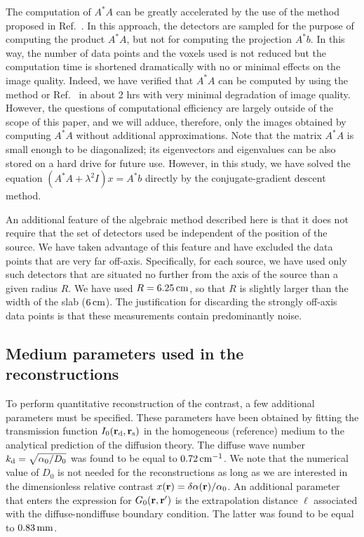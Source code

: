 The computation of $A^*A$ can be greatly accelerated by the use of the method proposed in Ref.~\cite{markel_05_6}. In this approach, the detectors are sampled for the purpose of computing the product $A^*A$, but not for computing the projection $A^*b$. In this way, the number of data points and the voxels used is not reduced but the computation time is shortened dramatically with no or minimal effects on the image quality. Indeed, we have verified that $A^*A$ can be computed by using the method or Ref.~\cite{markel_05_6} in about 2 hrs with very minimal degradation of image quality. However, the questions of computational efficiency are largely outside of the scope of this paper, and we will adduce, therefore, only the images obtained by computing $A^*A$ without additional approximations. Note that the matrix $A^*A$ is small enough to be diagonalized; its eigenvectors and eigenvalues can be also stored on a hard drive for future use. However, in this study, we have solved the equation $(A^*A+\lambda^2I)x=A^*b$ directly by the conjugate-gradient descent method.

An additional feature of the algebraic method described here is that it does not require that the set of detectors used be independent of the position of 
the source. We have taken advantage of this feature and have excluded the data points that are very far off-axis. Specifically, for each source, we 
have used only such detectors that are situated no further from the axis of the source than a given radius $R$. We have used $R=6.25\,{\rm cm}$, so 
that $R$ is slightly larger than the width of the slab ($6\,{\rm cm}$). The justification for discarding the strongly off-axis data points is that  these measurements contain predominantly noise.

\subsection{Medium parameters used in the reconstructions}
\label{subsec:med_par}

To perform quantitative reconstruction of the contrast, a few additional parameters must be specified. These parameters have been
obtained by fitting the transmission function $I_0({\bf r}_{\rm d},{\bf r}_{\rm s})$ in the homogeneous (reference) medium to the analytical prediction of the diffusion theory.  The diffuse wave number $k_{\rm d}=\sqrt{\alpha_0/D_0}$ was found to be equal to $0.72\,{\rm cm}^{-1}$. We note that the numerical value of $D_0$ is not needed for the reconstructions as long as we are interested in the dimensionless relative contrast $x({\bf r})=\delta\alpha({\bf   r})/\alpha_0$. An additional parameter that enters the expression for $G_0({\bf r},{\bf r}^{\prime})$ is the extrapolation distance
$\ell$ associated with the diffuse-nondiffuse boundary condition. The latter was found to be equal to $0.83\,{\rm mm}$. 

